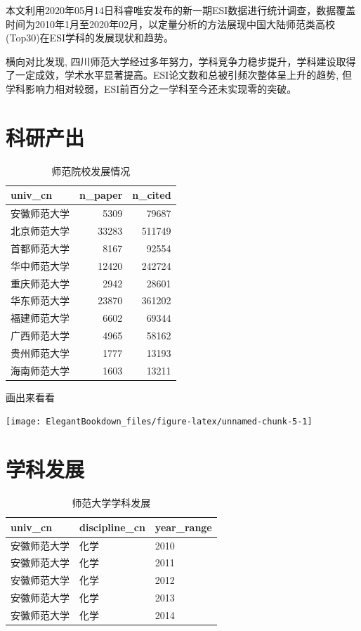 \documentclass[cn, 11pt, fancy, hide]{elegantbook}
\begin{document}
本文利用2020年05月14日科睿唯安发布的新一期ESI数据进行统计调查，数据覆盖时间为2010年1月至2020年02月，以定量分析的方法展现中国大陆师范类高校(Top30)在ESI学科的发展现状和趋势。

横向对比发现, 四川师范大学经过多年努力，学科竞争力稳步提升，学科建设取得了一定成效，学术水平显著提高。ESI论文数和总被引频次整体呈上升的趋势, 但学科影响力相对较弱，ESI前百分之一学科至今还未实现零的突破。

\hypertarget{ux79d1ux7814ux4ea7ux51fa}{%
\section{科研产出}\label{ux79d1ux7814ux4ea7ux51fa}}

\begin{table}[!h]

\caption{\label{tab:unnamed-chunk-4}师范院校发展情况}
\centering
\begin{tabular}[t]{lrr}
\toprule
univ\_cn & n\_paper & n\_cited\\
\midrule
安徽师范大学 & 5309 & 79687\\
北京师范大学 & 33283 & 511749\\
首都师范大学 & 8167 & 92554\\
华中师范大学 & 12420 & 242724\\
重庆师范大学 & 2942 & 28601\\
\addlinespace
华东师范大学 & 23870 & 361202\\
福建师范大学 & 6602 & 69344\\
广西师范大学 & 4965 & 58162\\
贵州师范大学 & 1777 & 13193\\
海南师范大学 & 1603 & 13211\\
\bottomrule
\end{tabular}
\end{table}

画出来看看

\begin{center}\texttt{[image: ElegantBookdown\_files/figure-latex/unnamed-chunk-5-1]} \end{center}

\hypertarget{ux5b66ux79d1ux53d1ux5c55}{%
\section{学科发展}\label{ux5b66ux79d1ux53d1ux5c55}}

\begin{table}[!h]

\caption{\label{tab:unnamed-chunk-6}师范大学学科发展}
\centering
\begin{tabular}[t]{lll}
\toprule
univ\_cn & discipline\_cn & year\_range\\
\midrule
安徽师范大学 & 化学 & 2010\\
安徽师范大学 & 化学 & 2011\\
安徽师范大学 & 化学 & 2012\\
安徽师范大学 & 化学 & 2013\\
安徽师范大学 & 化学 & 2014\\
\bottomrule
\end{tabular}
\end{table}
\end{document}
